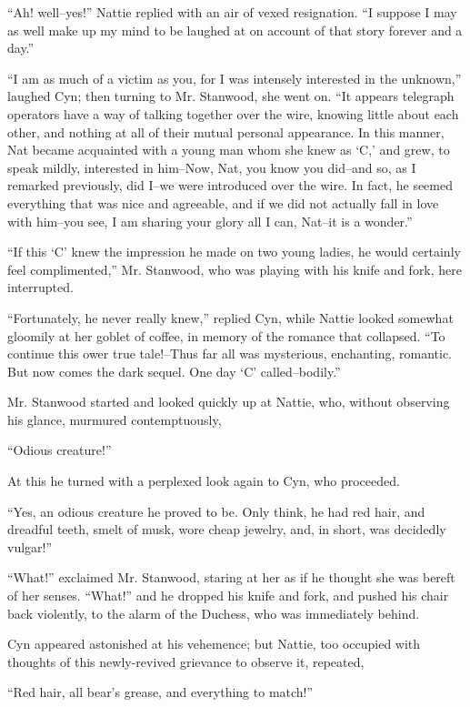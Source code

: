 ``Ah! well--yes!'' Nattie replied with an air of vexed resignation. ``I
suppose I may as well make up my mind to be laughed at on account of
that story forever and a day.''

``I am as much of a victim as you, for I was intensely interested in the
unknown,'' laughed Cyn; then turning to Mr. Stanwood, she went on. ``It
appears telegraph operators have a way of talking together over the
wire, knowing little about each other, and nothing at all of their
mutual personal appearance. In this manner, Nat became acquainted with a
young man whom she knew as `C,' and grew, to speak mildly, interested in
him--Now, Nat, you know you did--and so, as I remarked previously, did
I--we were introduced over the wire. In fact, he seemed everything that
was nice and agreeable, and if we did not actually fall in love with
him--you see, I am sharing your glory all I can, Nat--it is a wonder.''

``If this `C' knew the impression he made on two young ladies, he would
certainly feel complimented,'' Mr. Stanwood, who was playing with his
knife and fork, here interrupted.

``Fortunately, he never really knew,'' replied Cyn, while Nattie looked
somewhat gloomily at her goblet of coffee, in memory of the romance that
collapsed. ``To continue this ower true tale!--Thus far all was
mysterious, enchanting, romantic. But now comes the dark sequel. One day
`C' called--bodily.''

Mr. Stanwood started and looked quickly up at Nattie, who, without
observing his glance, murmured contemptuously,

``Odious creature!''

At this he turned with a perplexed look again to Cyn, who proceeded.

``Yes, an odious creature he proved to be. Only think, he had red hair,
and dreadful teeth, smelt of musk, wore cheap jewelry, and, in short,
was decidedly vulgar!''

``What!'' exclaimed Mr. Stanwood, staring at her as if he thought she was
bereft of her senses. ``What!'' and he dropped his knife and fork, and
pushed his chair back violently, to the alarm of the Duchess, who was
immediately behind.

Cyn appeared astonished at his vehemence; but Nattie, too occupied with
thoughts of this newly-revived grievance to observe it, repeated,

``Red hair, all bear's grease, and everything to match!''

